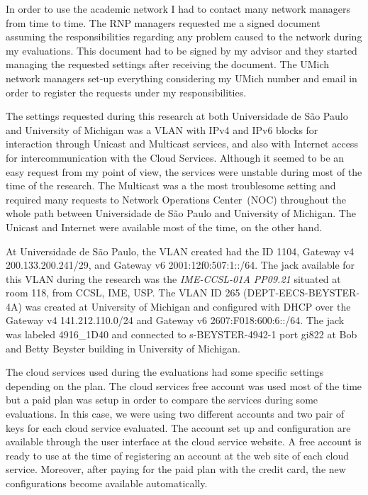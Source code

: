 In order to use the academic network I had to contact many network managers from time to time.
The RNP managers requested me a signed document assuming the responsibilities regarding any problem caused to the network during my evaluations.
This document had to be signed by my advisor and they started managing the requested settings after receiving the document.
The UMich network managers set-up everything considering my UMich number and email in order to register the requests under my responsibilities.

The settings requested during this research at both Universidade de São Paulo and University of Michigan was a VLAN with IPv4 and IPv6 blocks for interaction through Unicast and Multicast services, and also with Internet access for intercommunication with the Cloud Services.
Although it seemed to be an easy request from my point of view, the services were unstable during most of the time of the research.
The Multicast was a the most troublesome setting and required many requests to Network Operations Center~(NOC) throughout the whole path between Universidade de São Paulo and University of Michigan.
The Unicast and Internet were available most of the time, on the other hand.

At Universidade de São Paulo, the VLAN created had the ID 1104, Gateway v4 200.133.200.241/29, and Gateway v6 2001:12f0:507:1::/64.
The jack available for this VLAN during the research was the \textit{IME-CCSL-01A PP09.21} situated at room 118, from CCSL, IME, USP.
The VLAN ID 265 (DEPT-EECS-BEYSTER-4A) was created at University of Michigan and configured with DHCP over the Gateway v4 141.212.110.0/24 and Gateway v6 2607:F018:600:6::/64.
The jack was labeled 4916\_1D40 and connected to s-BEYSTER-4942-1 port gi8\/22 at Bob and Betty Beyster building in University of Michigan.




The cloud services used during the evaluations had some specific settings depending on the plan. 
The cloud services free account was used most of the time but a paid plan was setup in order to compare the services during some evaluations.
In this case, we were using two different accounts and two pair of keys for each cloud service evaluated.
The account set up and configuration are available through the user interface at the cloud service website.
A free account is ready to use at the time of registering an account at the web site of each cloud service.
Moreover, after paying for the paid plan with the credit card, the new configurations become available automatically.

